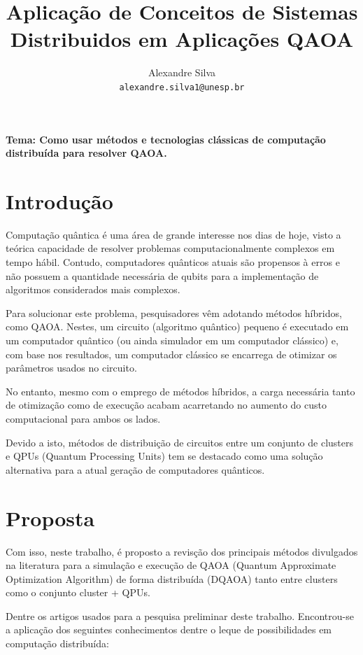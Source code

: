 \documentclass{paper}
\title{Aplicação de Conceitos de Sistemas Distribuidos em Aplicações QAOA}
\author{Alexandre Silva \\ \texttt{alexandre.silva1@unesp.br}}
\begin{document}
\maketitle

\noindent
\textbf{Tema: Como usar métodos e tecnologias clássicas de computação distribuída para resolver QAOA.} 


\section{Introdução}

Computação quântica é uma área de grande interesse nos dias de hoje, visto a teórica capacidade de resolver problemas computacionalmente complexos em tempo hábil. Contudo, computadores quânticos atuais são propensos à erros e não possuem a quantidade necessária de qubits para a implementação de algoritmos considerados mais complexos.

Para solucionar este problema, pesquisadores vêm adotando métodos híbridos, como QAOA. Nestes, um circuito (algoritmo quântico) pequeno é executado em um computador quântico (ou ainda simulador em um computador clássico) e, com base nos resultados, um computador clássico se encarrega de otimizar os parâmetros usados no circuito.

No entanto, mesmo com o emprego de métodos híbridos, a carga necessária tanto de otimização como de execução acabam acarretando no aumento do custo computacional para ambos os lados.

Devido a isto, métodos de distribuição de circuitos entre um conjunto de clusters e QPUs (Quantum Processing Units) tem se destacado como uma solução alternativa para a atual geração de computadores quânticos.

\section{Proposta}

Com isso, neste trabalho, é proposto a revisção dos principais métodos divulgados na literatura para a simulação e execução de QAOA (Quantum Approximate Optimization Algorithm) de forma distribuída (DQAOA) tanto entre clusters como o conjunto cluster + QPUs.


Dentre os artigos usados para a pesquisa preliminar deste trabalho. Encontrou-se a aplicação dos seguintes conhecimentos dentre o leque de possibilidades em computação distribuída:
\end{document}

